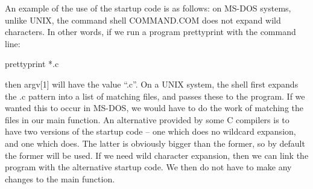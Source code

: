 An example of the use of the startup code is as follows: on MS-DOS
systems, unlike UNIX, the command shell {\fn COMMAND.COM} does not
expand wild characters. In other words, if we run a program {\cmd
prettyprint} with the command line:
\begin{display}\cmd
prettyprint *.c
\end{display}
\noindent
then {\cd argv[1]} will have the value ``{\cd *.c}''. On a UNIX
system, the shell first expands the {\cd *.c} pattern into a list of
matching files, and passes these to the program. If we wanted this to
occur in MS-DOS, we would have to do the work of matching the files
in our {\cd main} function. An alternative provided by some C
compilers is to have two versions of the startup code -- one which
does no wildcard expansion, and one which does. The latter is
obviously bigger than the former, so by default the former will be
used. If we need wild character expansion, then we can link the
program with the alternative startup code. We then do not have to
make any changes to the {\cd main} function.

